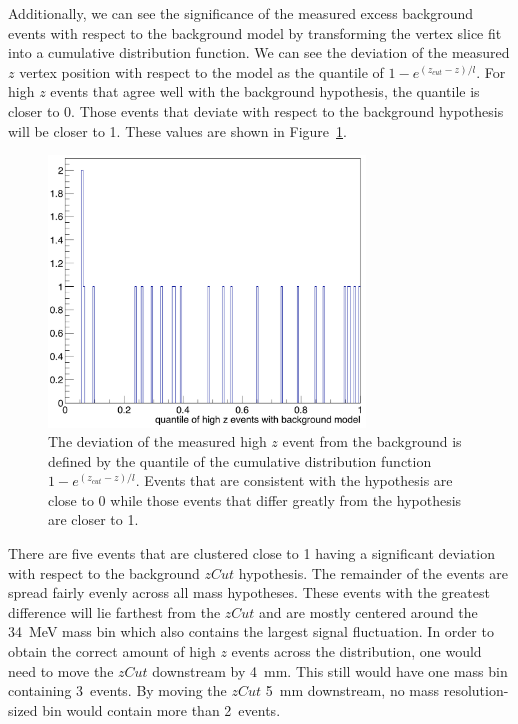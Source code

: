 \indent Additionally, we can see the significance of the measured excess background events with respect to the background model by transforming the vertex slice fit into a cumulative distribution function. We can see the deviation of the measured $z$ vertex position with respect to the model as the quantile of $1-e^{(z_{cut}-z)/l}$. For high $z$ events that agree well with the background hypothesis, the quantile is closer to 0. Those events that deviate with respect to the background hypothesis will be closer to 1. These values are shown in Figure~\ref{fig:highz_quantile}.
\begin{figure}[htb]
  \centering
      \includegraphics[width=0.75\textwidth]{pics/results/highz_quantiles.png}
  \caption[Deviation of the measured high $z$ event from the background $zCut$]{The deviation of the measured high $z$ event from the background is defined by the quantile of the cumulative distribution function $1-e^{(z_{cut}-z)/l}$. Events that are consistent with the hypothesis are close to 0 while those events that differ greatly from the hypothesis are closer to 1.}
  \label{fig:highz_quantile}
\end{figure} 
There are five events that are clustered close to 1 having a significant deviation with respect to the background $zCut$ hypothesis. The remainder of the events are spread fairly evenly across all mass hypotheses. These events with the greatest difference will lie farthest from the $zCut$ and are mostly centered around the 34~MeV mass bin which also contains the largest signal fluctuation. In order to obtain the correct amount of high $z$ events across the distribution, one would need to move the $zCut$ downstream by 4~mm. This still would have one mass bin containing 3~events. By moving the $zCut$ 5~mm downstream, no mass resolution-sized bin would contain more than 2~events. 

